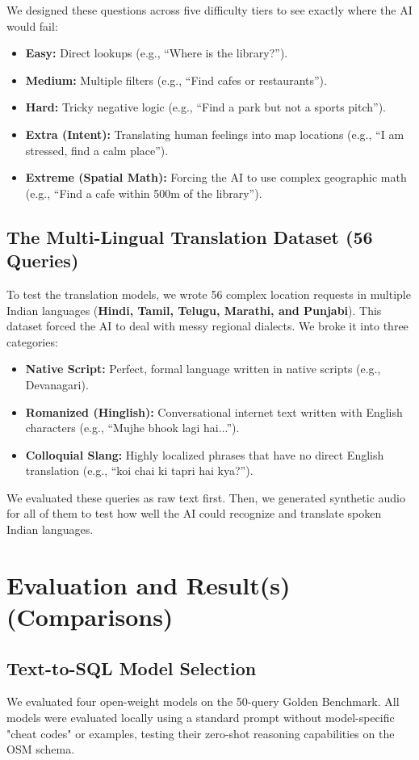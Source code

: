 \documentclass[11pt,a4paper]{article}
\begin{document}
We designed these questions across five difficulty tiers to see exactly where the AI would fail:
\begin{itemize}
    \item \textbf{Easy:} Direct lookups (e.g., ``Where is the library?'').
    \item \textbf{Medium:} Multiple filters (e.g., ``Find cafes or restaurants'').
    \item \textbf{Hard:} Tricky negative logic (e.g., ``Find a park but not a sports pitch'').
    \item \textbf{Extra (Intent):} Translating human feelings into map locations (e.g., ``I am stressed, find a calm place'').
    \item \textbf{Extreme (Spatial Math):} Forcing the AI to use complex geographic math (e.g., ``Find a cafe within 500m of the library'').
\end{itemize}

\subsection{The Multi-Lingual Translation Dataset (56 Queries)}
To test the translation models, we wrote 56 complex location requests in multiple Indian languages (\textbf{Hindi, Tamil, Telugu, Marathi, and Punjabi}). This dataset forced the AI to deal with messy regional dialects. We broke it into three categories:
\begin{itemize}
    \item \textbf{Native Script:} Perfect, formal language written in native scripts (e.g., Devanagari).
    \item \textbf{Romanized (Hinglish):} Conversational internet text written with English characters (e.g., ``Mujhe bhook lagi hai...'').
    \item \textbf{Colloquial Slang:} Highly localized phrases that have no direct English translation (e.g., ``koi chai ki tapri hai kya?'').
\end{itemize}
We evaluated these queries as raw text first. Then, we generated synthetic audio for all of them to test how well the AI could recognize and translate spoken Indian languages.



\section{Evaluation and Result(s) (Comparisons)}

\subsection{Text-to-SQL Model Selection}
We evaluated four open-weight models on the 50-query Golden Benchmark. All models were evaluated locally using a standard prompt without model-specific "cheat codes" or examples, testing their zero-shot reasoning capabilities on the OSM schema.
\end{document}
